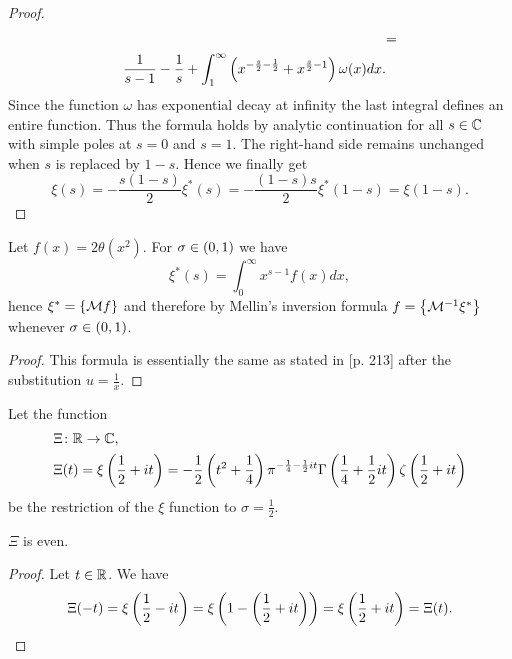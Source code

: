 \begin{proof}
\begin{equation*}
\begin{aligned}
	&= \\
		\frac{1}{s - 1} - \frac{1}{s} + \int _1 ^\infty \left(x^{-\frac{s}{2} - \frac{1}{2}} + x^{\frac{s}{2} - 1}\right) \omega(x) dx &.
\end{aligned}
\end{equation*}
	Since the function $\omega$ has exponential decay at infinity the last integral defines an entire function. Thus the formula holds by analytic continuation for all $s \in \mathbb{C}$ with simple poles at $s = 0$ and $s = 1$. The right-hand side remains unchanged when $s$ is replaced by $1 - s$. Hence we finally get
\begin{equation*}
	\xi(s) = -\frac{s(1 - s)}{2} \xi^*(s) = -\frac{(1 - s)s}{2} \xi^*(1 - s) = \xi(1 - s).
\end{equation*}
\end{proof}


\begin{lemma}\label{lem:XiMellin}
	Let $f(x) = 2 \theta(x^2)$. For $\sigma \in \left(0, 1\right)$ we have
\begin{equation*}
	\xi^*(s) = \int _0 ^\infty x^{s - 1} f(x) dx,
\end{equation*}
	hence $\xi^* = \left\{\mathcal{M} f\right\}$ and therefore by Mellin's inversion formula $f = \left\{\mathcal{M}^{-1} \xi^*\right\}$ whenever $\sigma \in \left(0, 1\right)$.
\end{lemma}
\begin{proof}
	This formula is essentially the same as stated in \cite{Edwards1974} [p. 213] after the substitution $u = \frac{1}{x}$.
\end{proof}


\begin{definition}
	Let the function
\begin{equation*}
\begin{aligned}
	&\Xi \colon \mathbb{R} \to \mathbb{C}, \\
	&\Xi(t) = \xi\left(\frac{1}{2} + it\right) = -\frac{1}{2}\left(t^2 + \frac{1}{4}\right) \pi ^{-\frac{1}{4} - \frac{1}{2} it} \Gamma\left(\frac{1}{4} + \frac{1}{2} it\right) \zeta\left(\frac{1}{2} + it\right)
\end{aligned}
\end{equation*}
	be the restriction of the $\xi$ function to $\sigma = \frac{1}{2}$.
\end{definition}


\begin{lemma}
	$\Xi$ is even.
\end{lemma}
\begin{proof}
	Let $t \in \mathbb{R}$. We have
\begin{equation*}
	\Xi(-t) = \xi\left(\frac{1}{2} - it\right) = \xi\left(1 - \left(\frac{1}{2} + it\right)\right) = \xi\left(\frac{1}{2} + it\right) = \Xi(t).
\end{equation*}
\end{proof}


